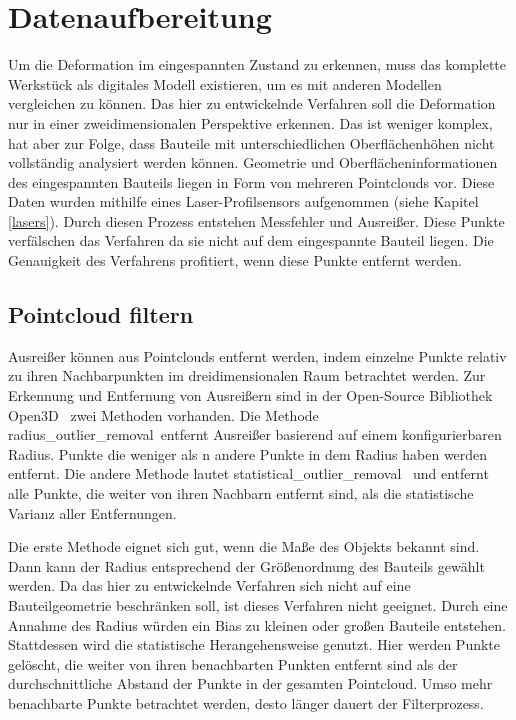 

\chapter{Datenaufbereitung} \label{prepareData}

Um die Deformation im eingespannten Zustand zu erkennen, muss das komplette Werkstück
als digitales Modell existieren, um es mit anderen Modellen vergleichen zu können.
Das hier zu entwickelnde Verfahren soll die Deformation nur in einer zweidimensionalen Perspektive erkennen. 
Das ist weniger komplex, hat aber zur Folge, dass Bauteile mit unterschiedlichen 
Oberflächenhöhen nicht vollständig analysiert werden können. 
Geometrie und Oberflächeninformationen des eingespannten Bauteils liegen 
in Form von mehreren Pointclouds vor.
Diese Daten wurden mithilfe eines Laser-Profilsensors aufgenommen 
(siehe Kapitel \ref{lasers}). Durch diesen Prozess 
entstehen Messfehler und Ausreißer. Diese Punkte verfälschen das Verfahren da sie 
nicht auf dem eingespannte Bauteil liegen. Die Genauigkeit des Verfahrens profitiert, 
wenn diese Punkte entfernt werden.

\section{Pointcloud filtern}
    
Ausreißer können aus Pointclouds entfernt werden, indem einzelne Punkte 
relativ zu ihren Nachbarpunkten im dreidimensionalen Raum betrachtet werden.
Zur Erkennung und Entfernung von Ausreißern sind in der Open-Source
Bibliothek \glqq Open3D\grqq~ zwei Methoden vorhanden. 
Die Methode \glqq radius\_outlier\_removal\grqq~entfernt Ausreißer basierend auf 
einem konfigurierbaren Radius. Punkte die weniger als n andere Punkte in dem Radius 
haben werden entfernt. Die andere Methode lautet 
\glqq statistical\_outlier\_removal\grqq~ 
und entfernt alle Punkte, die weiter von ihren Nachbarn entfernt sind, als die 
statistische Varianz aller Entfernungen. \cite{Zhou.30012018}

Die erste Methode eignet sich gut, wenn die Maße des Objekts bekannt
sind. Dann kann der Radius entsprechend der Größenordnung des Bauteils gewählt werden.
Da das hier zu entwickelnde Verfahren sich nicht auf eine Bauteilgeometrie 
beschränken soll, ist dieses Verfahren nicht geeignet. 
Durch eine Annahme des Radius würden ein Bias 
zu kleinen oder großen Bauteile entstehen.
Stattdessen wird die statistische Herangehensweise genutzt. 
Hier werden Punkte gelöscht, die weiter von ihren benachbarten Punkten entfernt
sind als der durchschnittliche Abstand der Punkte in der gesamten Pointcloud. 
Umso mehr benachbarte Punkte betrachtet werden, desto länger dauert der Filterprozess.

